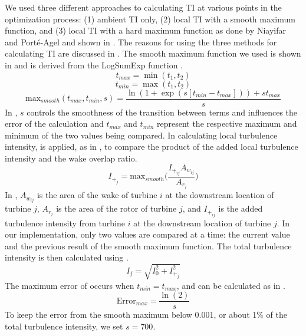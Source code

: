 \documentclass[conf]{new-aiaa}
\begin{document}
We used three different approaches to calculating TI at various points in the optimization process: (1) ambient TI only, (2) local TI with a smooth maximum function, and (3) local TI with a hard maximum function as done by Niayifar and Port\'{e}-Agel \cite{niayifar2016} and shown in . The reasons for using the three methods for calculating TI are discussed in . The smooth maximum function we used is shown in  and is derived from the LogSumExp function \cite{cook2010-softmaximum}.
%
\begin{equation}\label{eq:smoothmax1}
    t_{max} = \min(t_1, t_2)
\end{equation}
\begin{equation}\label{eq:smoothmax2}
    t_{min} = \max(t_1, t_2)
\end{equation}
\begin{equation}\label{eq:smoothmax3}
  \text{max}_{smooth}(t_{max},t_{min},s) = \frac{\ln(1+\exp(s[t_{min}-t_{max}]))+s t_{max}}{s}
\end{equation}
%
In , $s$ controls the smoothness of the transition between terms and influences the error of the calculation and $t_{max}$ and $t_{min}$ represent the respective maximum and minimum of the two values being compared. In calculating local turbulence intensity,  is applied, as in  , to compare the product of the added local turbulence intensity and the wake overlap ratio.
%
\begin{equation}\label{eq:maxti}
    I_{+_j} = \text{max}_{smooth}{\bigg(\frac{I_{+_{ij}}A_{w_{ij}}}{A_{r_j}}\bigg)}
\end{equation}
%
In , $A_{w_{ij}}$ is the area of the wake of turbine $i$ at the downstream location of turbine $j$, $A_{r_j}$ is the area of the rotor of turbine $j$, and $I_{+_{ij}}$ is the added turbulence intensity from turbine $i$ at the downstream location of turbine $j$. In our implementation, only two values are compared at a time: the current value and the previous result of the smooth maximum function. The total turbulence intensity is then calculated using .
%
\begin{equation}\label{eq:ti_at_turb}
    I_j = \sqrt{I_0^2+I_{+_j}^2}
\end{equation}
%
The maximum error of  occurs when $t_{min} = t_{max}$, and can be calculated as in .
%
\begin{equation}\label{eq:error_max}
	\text{Error}_{max} = \frac{\ln{(2)}}{s}
\end{equation}
%
To keep the error from the smooth maximum below 0.001, or about 1\% of the total turbulence intensity, we set $s=700$.
\end{document}
